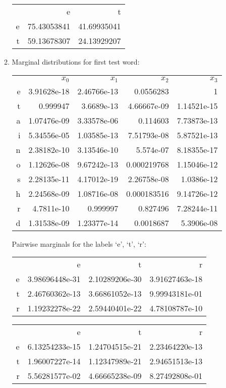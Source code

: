 \documentclass[12pt]{article}
\begin{document}
\begin{enumerate}
\begin{enumerate}
\begin{center}
\begin{tabular}{rrr}
& e & t \\
e & 75.43053841 & 41.69935041 \\
t & 59.13678307 & 24.13929207
\end{tabular}
\end{center}

\item %
Marginal distributions for first test word:
\begin{center}
\begin{tabular}{rrrrr}
 & $x_0$ & $x_1$ & $x_2$ & $x_3$ \\
e  & 3.91628e-18 & 2.46766e-13 & 0.0556283 & 1 \\
t  & 0.999947 & 3.6689e-13 & 4.66667e-09 & 1.14521e-15 \\
a  & 1.07476e-09 & 3.33578e-06 & 0.114603 & 7.73873e-13 \\
i  & 5.34556e-05 & 1.03585e-13 & 7.51793e-08 & 5.87521e-13 \\
n  & 2.38182e-10 & 3.13546e-10 & 5.574e-07 & 8.18355e-17 \\
o  & 1.12626e-08 & 9.67242e-13 & 0.000219768 & 1.15046e-12 \\
s  & 2.28135e-11 & 4.17012e-19 & 2.26758e-08 & 1.0386e-12 \\
h  & 2.24568e-09 & 1.08716e-08 & 0.000183516 & 9.14726e-12 \\
r  & 4.7811e-10 & 0.999997 & 0.827496 & 7.28244e-11 \\
d  & 1.31538e-09 & 1.23377e-14 & 0.0018687 & 5.3906e-08 \\
\end{tabular}
\end{center}

Pairwise marginals for the labels `e', `t', `r':

\begin{center}
\begin{tabular}{rrrr}
& e & t & r \\
e & 3.98696448e-31 & 2.10289206e-30 & 3.91627463e-18 \\
t & 2.46760362e-13 & 3.66861052e-13 & 9.99943181e-01 \\
r & 1.19232278e-22 & 2.59440401e-22 & 4.78108787e-10
\end{tabular}
\end{center}

\begin{center}
\begin{tabular}{rrrr}
& e & t & r \\
e & 6.13254233e-15 & 1.24704515e-21 & 2.23464220e-13 \\
t & 1.96007227e-14 & 1.12347989e-21 & 2.94651513e-13 \\
r & 5.56281577e-02 & 4.66665238e-09 & 8.27492808e-01
\end{tabular}
\end{center}
  

\end{enumerate}
\end{enumerate}
\end{document}

